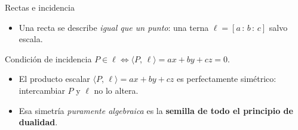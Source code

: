 \documentclass[aspectratio=169]{beamer}
\newcommand{\inc}[2]{\langle #1,\, #2\rangle}
\newcommand{\hp}[3]{[#1\,{:}\,#2\,{:}\,#3]}
\begin{document}
\begin{frame}{Rectas e incidencia}
  \begin{itemize}
    \item Una recta se describe \emph{igual que un punto}: una terna
          $\ell=\hp{a}{b}{c}$ salvo escala.
  \end{itemize}
  \vspace{0.2cm}
  \begin{block}{Condición de incidencia}
    \centering\large
    $\displaystyle P\in\ell \iff \inc{P}{\ell}=ax+by+cz=0.$
  \end{block}
  \vspace{0.2cm}
  \begin{itemize}
    \item El producto escalar $\inc{P}{\ell}=ax+by+cz$ es
          \alert{perfectamente simétrico}: intercambiar $P$ y $\ell$ no lo
          altera.
    \item Esa simetría \emph{puramente algebraica} es la \textbf{semilla de
          todo el principio de dualidad}.
  \end{itemize}
\end{frame}
\end{document}
